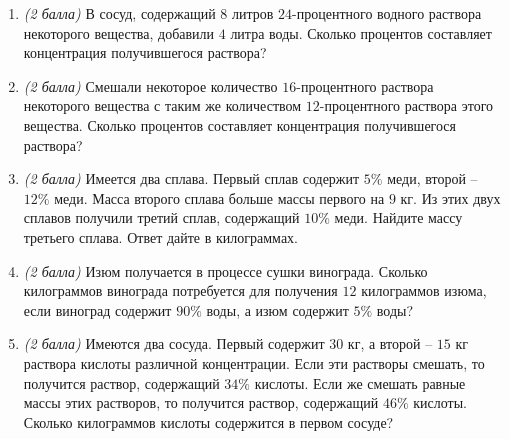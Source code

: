 \documentclass[12pt, a4paper]{article}
\begin{document}
	
	
	\begin{enumerate}
		\item \textit{(2 балла)} В сосуд, содержащий $8$ литров $24$-процентного водного раствора некоторого вещества, добавили $4$ литра воды. Сколько процентов составляет концентрация получившегося раствора?
		\item \textit{(2 балла)} Смешали некоторое количество $16$-процентного раствора некоторого вещества с таким же количеством $12$-процентного раствора этого вещества. Сколько процентов составляет концентрация получившегося раствора?
		\item \textit{(2 балла)} Имеется два сплава. Первый сплав содержит $5\%$ меди, второй – $12\%$ меди. Масса второго сплава больше массы первого на $9$ кг. Из этих двух сплавов получили третий сплав, содержащий $10\%$ меди. Найдите массу третьего сплава. Ответ дайте в килограммах.
		\item \textit{(2 балла)} Изюм получается в процессе сушки винограда. Сколько килограммов винограда потребуется для получения $12$ килограммов изюма, если виноград содержит $90\%$ воды, а изюм содержит $5\%$ воды?
		\item \textit{(2 балла)} Имеются два сосуда. Первый содержит $30$ кг, а второй – $15$ кг раствора кислоты различной концентрации. Если эти растворы смешать, то получится раствор, содержащий $34\%$ кислоты. Если же смешать равные массы этих растворов, то получится раствор, содержащий $46\%$ кислоты. Сколько килограммов кислоты содержится в первом сосуде?
	\end{enumerate}
\end{document}
